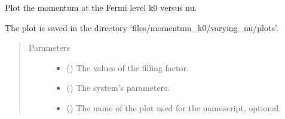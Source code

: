 \documentclass[letterpaper,10pt,english]{sphinxmanual}
\begin{document}
\begin{fulllineitems}
\label{\detokenize{modules:modules.utils.plot_k0_vs_nu}}
\pysigstartsignatures
{}
\pysigstopsignatures
\sphinxAtStartPar
Plot the momentum at the Fermi level k0 versus nu.

\sphinxAtStartPar
The plot is saved in the directory ‘files/momentum\_k0/varying\_nu/plots’.
\begin{quote}\begin{description}
\item[{Parameters}] \leavevmode\begin{itemize}
\item {} 
\sphinxAtStartPar
{} () \textendash{} The values of the filling factor.

\item {} 
\sphinxAtStartPar
{} () \textendash{} The system’s parameters.

\item {} 
\sphinxAtStartPar
{} () \textendash{} The name of the plot used for the manuscript, optional.

\end{itemize}

\end{description}\end{quote}

\end{fulllineitems}

\end{document}
